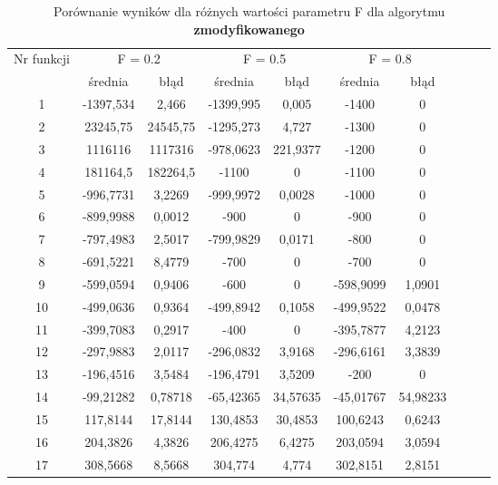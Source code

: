\documentclass[a4paper,12pt]{article}
\theoremstyle{definition}
\begin{document}
\begin{table}[H]
\centering
\def\arraystretch{1.3}
\setlength\tabcolsep{10pt}
\caption{Porównanie wyników dla różnych wartości parametru F dla algorytmu \textbf{zmodyfikowanego}}
\vspace{8pt}
\begin{tabular}{|c|c|c|c|c|c|c|c|c|c|}
	
	\hline
	\multirow{2}{*}{Nr funkcji} & \multicolumn{2}{c|}{F = 0.2} & \multicolumn{2}{c|}{F = 0.5} & \multicolumn{2}{c|}{F = 0.8}\\
	\cline{2-7}
	& średnia & błąd & średnia & błąd & średnia & błąd \\\hline
	1     & -1397,534 & 2,466 & -1399,995 & 0,005 & -1400 & 0 \\\hline
    2     & 23245,75 & 24545,75 & -1295,273 & 4,727 & -1300 & 0 \\\hline
    3     & 1116116 & 1117316 & -978,0623 & 221,9377 & -1200 & 0 \\\hline
    4     & 181164,5 & 182264,5 & -1100 & 0     & -1100 & 0 \\\hline
    5     & -996,7731 & 3,2269 & -999,9972 & 0,0028 & -1000 & 0 \\\hline
    6     & -899,9988 & 0,0012 & -900  & 0     & -900  & 0 \\\hline
    7     & -797,4983 & 2,5017 & -799,9829 & 0,0171 & -800  & 0 \\\hline
    8     & -691,5221 & 8,4779 & -700  & 0     & -700  & 0 \\\hline
    9     & -599,0594 & 0,9406 & -600  & 0     & -598,9099 & 1,0901 \\\hline
    10    & -499,0636 & 0,9364 & -499,8942 & 0,1058 & -499,9522 & 0,0478 \\\hline
    11    & -399,7083 & 0,2917 & -400  & 0     & -395,7877 & 4,2123 \\\hline
    12    & -297,9883 & 2,0117 & -296,0832 & 3,9168 & -296,6161 & 3,3839 \\\hline
    13    & -196,4516 & 3,5484 & -196,4791 & 3,5209 & -200  & 0 \\\hline
    14    & -99,21282 & 0,78718 & -65,42365 & 34,57635 & -45,01767 & 54,98233 \\\hline
    15    & 117,8144 & 17,8144 & 130,4853 & 30,4853 & 100,6243 & 0,6243 \\\hline
    16    & 204,3826 & 4,3826 & 206,4275 & 6,4275 & 203,0594 & 3,0594 \\\hline
    17    & 308,5668 & 8,5668 & 304,774 & 4,774 & 302,8151 & 2,8151 \\\hline

\end{tabular}
\end{table}
\end{document}
